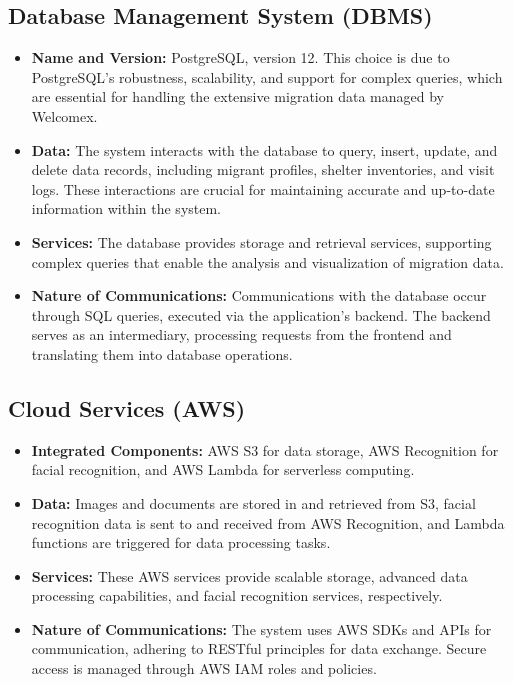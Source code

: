 \documentclass{scrreprt}
\begin{document}
\subsection*{Database Management System (DBMS)}
\begin{itemize}
    \item \textbf{Name and Version:} PostgreSQL, version 12. This choice is due to PostgreSQL's robustness, scalability, and support for complex queries, which are essential for handling the extensive migration data managed by Welcomex.
    \item \textbf{Data:} The system interacts with the database to query, insert, update, and delete data records, including migrant profiles, shelter inventories, and visit logs. These interactions are crucial for maintaining accurate and up-to-date information within the system.
    \item \textbf{Services:} The database provides storage and retrieval services, supporting complex queries that enable the analysis and visualization of migration data.
    \item \textbf{Nature of Communications:} Communications with the database occur through SQL queries, executed via the application's backend. The backend serves as an intermediary, processing requests from the frontend and translating them into database operations.
\end{itemize}

\subsection*{Cloud Services (AWS)}
\begin{itemize}
    \item \textbf{Integrated Components:} AWS S3 for data storage, AWS Recognition for facial recognition, and AWS Lambda for serverless computing.
    \item \textbf{Data:} Images and documents are stored in and retrieved from S3, facial recognition data is sent to and received from AWS Recognition, and Lambda functions are triggered for data processing tasks.
    \item \textbf{Services:} These AWS services provide scalable storage, advanced data processing capabilities, and facial recognition services, respectively.
    \item \textbf{Nature of Communications:} The system uses AWS SDKs and APIs for communication, adhering to RESTful principles for data exchange. Secure access is managed through AWS IAM roles and policies.
\end{itemize}
\end{document}
